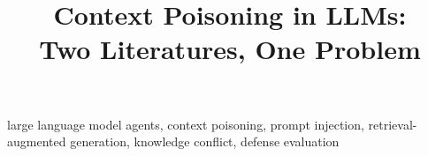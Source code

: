 \documentclass[conference]{IEEEtran}
\begin{document}
%
\title{Context Poisoning in LLMs:\\
Two Literatures, One Problem}

\author{
}

\maketitle

\begin{abstract}

\end{abstract}

\begin{IEEEkeywords}
large language model agents, context poisoning, prompt injection,
retrieval-augmented generation, knowledge conflict, defense evaluation
\end{IEEEkeywords}


















\appendix


%
% 
\end{document}
